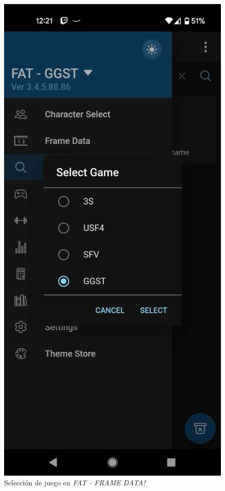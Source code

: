 \begin{figure}
    \centering
    \includegraphics[height=0.4\textheight]{figures/game_options.png}
    \caption{Selección de juego en \textit{FAT - FRAME DATA!}}
    \label{fig: game select}
\end{figure}

